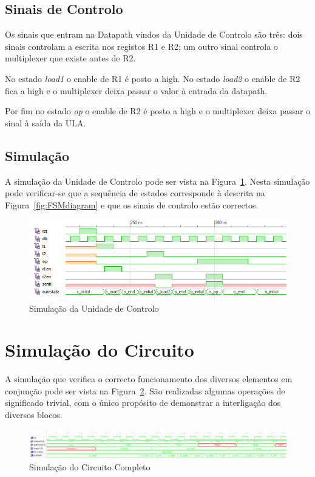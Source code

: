\documentclass[a4paper]{article}
\begin{document}
\subsection{Sinais de Controlo}
Os sinais que entram na Datapath vindos da Unidade de Controlo são três: dois sinais controlam a escrita nos registos R1 e R2; um outro sinal controla o multiplexer que existe antes de R2.

No estado \textit{load1} o enable de R1 é posto a high. No estado \textit{load2} o enable de R2 fica a high e o multiplexer deixa passar o valor à entrada da datapath.

Por fim no estado \textit{op} o enable de R2 é posto a high e o multiplexer deixa passar o sinal à saída da ULA.

\subsection{Simulação}
A simulação da Unidade de Controlo pode ser vista na Figura~\ref{fig:controlo_sim}. Nesta simulação pode verificar-se que a sequência de estados corresponde à descrita na Figura~\ref{fig:FSMdiagram} e que os sinais de controlo estão correctos.

\begin{figure}[H]
	\centering
	\includegraphics[width=\textwidth]{control_sim}
	\caption{Simulação da Unidade de Controlo}
	\label{fig:controlo_sim}
\end{figure}

\pagebreak


\section{Simulação do Circuito}
A simulação que verifica o correcto funcionamento dos diversos elementos em conjunção pode ser vista na Figura~\ref{fig:circuit_sim}. São realizadas algumas operações de significado trivial, com o único propósito de demonstrar a interligação dos diversos blocos. 

\begin{figure}[H]
	\centering
	\includegraphics[width=\textwidth]{circuit_sim}
	\caption{Simulação do Circuito Completo}
	\label{fig:circuit_sim}
\end{figure}
\end{document}
